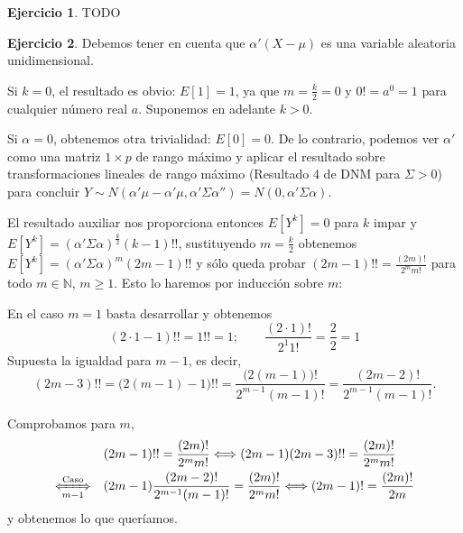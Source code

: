 \documentclass[12pt,spanish]{article}
\theoremstyle{definition}
\newtheorem{exercise}{Ejercicio}
\begin{document}
\begin{exercise} %
  TODO
\end{exercise}

\begin{exercise} %

  Debemos tener en cuenta que $\alpha'(X-\mu)$ es una variable
  aleatoria unidimensional.
  
  Si $k=0$, el resultado es obvio: $E[1]=1$, ya que $m=\frac{k}{2}=0$
  y $0!=a^0=1$ para cualquier número real $a$. Suponemos en adelante
  $k>0$.
  
  Si $\alpha=0$, obtenemos otra trivialidad: $E[0]=0$. De lo
  contrario, podemos ver $\alpha'$ como una matriz $1\times p$ de
  rango máximo y aplicar el resultado sobre transformaciones lineales
  de rango máximo (Resultado 4 de DNM para $\Sigma>0$) para concluir
  $Y\sim
  N(\alpha'\mu-\alpha'\mu,\alpha'\Sigma\alpha'')=N(0,\alpha'\Sigma\alpha)$.
  
  El resultado auxiliar nos proporciona entonces $E[Y^k]=0$ para $k$
  impar y \\ $E[Y^k]=(\alpha'\Sigma\alpha)^\frac{k}{2} (k-1)!!$,
  sustituyendo $m=\frac{k}{2}$ obtenemos
  $E[Y^k]=(\alpha'\Sigma\alpha)^m (2m-1)!!$ y sólo queda probar
  $(2m-1)!!=\frac{(2m)!}{2^m m!}$ para todo $m\in\mathbb{N}$,
  $m\geq 1$. Esto lo haremos por inducción sobre $m$:
  
  En el caso $m=1$ basta desarrollar y obtenemos
  \[(2\cdot 1-1)!!=1!!=1;\qquad \frac{(2\cdot 1)!}{2^1
      1!}=\frac{2}{2}=1\] Supuesta la igualdad para $m-1$, es decir,
  \[(2m-3)!!=\big(2(m-1)-1\big)!!=\frac{\big(2(m-1)\big)!}{2^{m-1} (m-1)!}=\frac{(2m-2)!}{2^{m-1} (m-1)!}.\]

  Comprobamos para $m$,
  \begin{align*}
    &(2m-1)!!=\frac{(2m)!}{2^m m!}
      \Longleftrightarrow (2m-1)(2m-3)!!=\frac{(2m)!}{2^m m!} \\
    \xLeftrightarrow[m-1]{\text{Caso}}\quad &(2m-1)\frac{(2m-2)!}{2^{m-1}(m-1)!}=\frac{(2m)!}{2^m m!} \Longleftrightarrow (2m-1)!=\frac{(2m)!}{2m}
  \end{align*}
  y obtenemos lo que queríamos.
  
\end{exercise}
\end{document}
